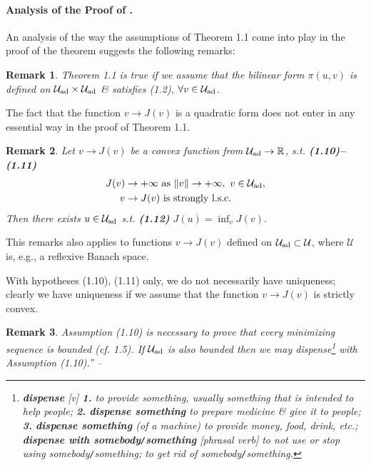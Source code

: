 \documentclass[oneside]{book}
\numberwithin{equation}{section}
\newtheorem{remark}{Remark}[chapter]
\begin{document}
\paragraph{Analysis of the Proof of \cite[Theorem 1.1]{Lions1971}.} An analysis of the way the assumptions of Theorem 1.1 come into play in the proof of the theorem suggests the following remarks:

\begin{remark}
	Theorem 1.1 is true if we assume that the bilinear form $\pi(u,v)$ is defined on $\mathcal{U}_{\rm ad}\times\mathcal{U}_{\rm ad}$ \& satisfies (1.2), $\forall v\in\mathcal{U}_{\rm ad}$.
\end{remark}
The fact that the function $v\to J(v)$ is a quadratic form does not enter in any essential way in  the proof of Theorem 1.1.

\begin{remark}
	Let $v\to J(v)$ be a convex function from $\mathcal{U}_{\rm ad}\to\mathbb{R}$, s.t. \textbf{(1.10)--(1.11)}
	\begin{align*}
		J(v)&\to+\infty\mbox{ as }\|v\|\to+\infty,\ v\in\mathcal{U}_{\rm ad},\\
		v&\to J(v)\mbox{ is strongly l.s.c.}
	\end{align*}
	Then there exists $u\in\mathcal{U}_{\rm ad}$ s.t. \textbf{(1.12)} $J(u) = \inf_v J(v)$.
\end{remark}
This remarks also applies to functions $v\to J(v)$ defined on $\mathcal{U}_{\rm ad}\subset\mathcal{U}$, where $\mathcal{U}$ is, e.g., a reflexive Banach space.

With hypotheses (1.10), (1.11) only, we do not necessarily have uniqueness; clearly we have uniqueness if we assume that the function $v\to J(v)$ is strictly convex.

\begin{remark}
	Assumption (1.10) is necessary to prove that every minimizing sequence is bounded (cf. 1.5). If $\mathcal{U}_{\rm ad}$ is also bounded then we may dispense\footnote{\textbf{dispense} [v] \textbf{1.} to provide something, usually something that is intended to help people; \textbf{2.} \textbf{dispense something} to prepare medicine \& give it to people; \textbf{3.} \textbf{dispense something} (of a machine) to provide money, food, drink, etc.; \textbf{dispense with somebody\texttt{/}something} [phrasal verb] to not use or stop using somebody\texttt{/}something; to get rid of somebody\texttt{/}something.} with Assumption (1.10).'' -- \cite[pp. 6--8]{Lions1971}
\end{remark}
\end{document}
